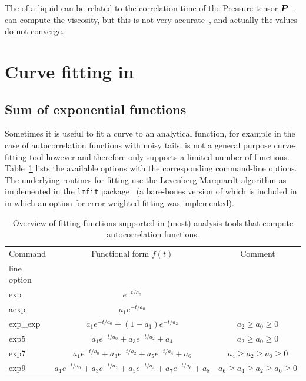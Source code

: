 The  of a liquid can be related to the correlation 
time of the Pressure tensor $\mbox{\boldmath ${P}$}$~\cite{PSmith93c,Balasubramanian96}.
{\tt {}} can compute the viscosity,
but this is not very accurate~\cite{Hess2002a}, and 
actually the values do not converge.

\section{Curve fitting in \gromacs}
\subsection{Sum of exponential functions}
Sometimes it is useful to fit a curve to an analytical function, for
example in the case of autocorrelation functions with noisy
tails. {\gromacs} is not a general purpose curve-fitting tool however
and therefore {\gromacs} only supports a limited number of
functions. 
Table~\ref{tab:fitfn} lists the available options with the
corresponding command-line options. The underlying routines for
fitting use the Levenberg-Marquardt algorithm as implemented in the
{\tt lmfit} package~\cite{lmfit} (a bare-bones version of which is
included in {\gromacs} in which an option for error-weighted fitting
was implemented). 
\begin{table}[ht]
\centering
\caption{Overview of fitting functions supported in (most) analysis tools
  that compute autocorrelation functions.}
\label{tab:fitfn}
\begin{tabular}{lcc}
\hline
Command & Functional form $f(t)$& Comment \\
line option         &           & \\
\hline
exp        & $e^{-t/{a_0}}$ &\\
aexp      & $a_1e^{-t/{a_0}}$ &\\
exp_exp & $a_1e^{-t/{a_0}}+(1-a_1)e^{-t/{a_2}}$ & $a_2\ge a_0\ge 0$\\
exp5      & $a_1e^{-t/{a_0}}+a_3e^{-t/{a_2}}+a_4$ &$a_2\ge a_0\ge 0$\\
exp7     &
$a_1e^{-t/{a_0}}+a_3e^{-t/{a_2}}+a_5e^{-t/{a_4}}+a_6$&$a_4\ge a_2\ge
a_0 \ge0$\\
exp9    &
$a_1e^{-t/{a_0}}+a_3e^{-t/{a_2}}+a_5e^{-t/{a_4}}+a_7e^{-t/{a_6}}+a_8$&$a_6\ge
a_4\ge a_2\ge a_0\ge 0$\\
\hline
\end{tabular}
\end{table}

